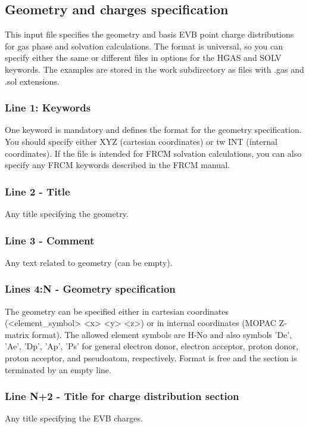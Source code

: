 \documentclass[oneside,11pt,openany]{book}
\newcommand{\tw}{\ttfamily}
\begin{document}
\subsection{Geometry and charges specification}
This input file specifies the geometry and basis EVB point charge
distributions for gas phase and solvation calculations. The format
is universal, so you can specify either the same or different files
in options for the HGAS and SOLV keywords. The examples are stored
in the {\tw work} subdirectory as files with {\tw .gas} and
{\tw .sol} extensions.
%
\subsubsection*{Line 1: Keywords}
One keyword is mandatory and defines the format for the geometry
specification. You should specify either {\tw XYZ}
(cartesian coordinates) or {tw INT} (internal coordinates).
If the file is intended for FRCM solvation calculations,
you can also specify any FRCM keywords described in the FRCM
manual.

\subsubsection*{Line 2 - Title}
Any title specifying the geometry.

\subsubsection*{Line 3 - Comment}
Any text related to geometry (can be empty).

\subsubsection*{Lines 4:N - Geometry specification}
The geometry can be specified either in cartesian coordinates
({\tw <element\_symbol>  <x>   <y>   <z>}) or in internal
coordinates ({\tw MOPAC} Z-matrix format). The allowed
element symbols are H-No and also symbols
'De', 'Ae', 'Dp', 'Ap', 'Ps' for general electron donor,
electron acceptor, proton donor, proton acceptor,
and pseudoatom, respectively. Format is free
and the section is terminated by an empty line.

\subsubsection*{Line N+2 - Title for charge distribution section}
Any title specifying the EVB charges.
\end{document}

